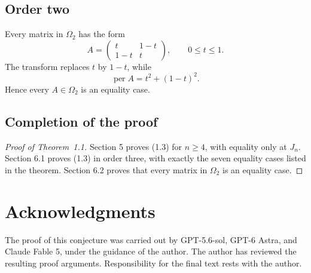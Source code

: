\documentclass[11pt]{article}
\begin{document}
\subsection{Order two}

Every matrix in $\Omega_2$ has the form
\[
A=\begin{pmatrix}t&1-t\\1-t&t\end{pmatrix},
\qquad 0\le t\le1.
\]
The transform replaces $t$ by $1-t$, while
\[
\operatorname{per}A=t^2+(1-t)^2.
\]
Hence every $A\in\Omega_2$ is an equality case.

\subsection{Completion of the proof}

\begin{proof}[Proof of Theorem~1.1]
Section 5 proves (1.3) for $n\ge4$, with equality
only at $J_n$. Section 6.1 proves (1.3) in order three, with exactly the seven
equality cases listed in the theorem. Section 6.2 proves that every matrix
in $\Omega_2$ is an equality case.
\end{proof}

\section*{Acknowledgments}

The proof of this conjecture was carried out by GPT-5.6-sol, GPT-6 Astra,
and Claude Fable 5, under the guidance of the author. The author has reviewed the
resulting proof arguments. Responsibility for the final text rests with the
author.
\end{document}
